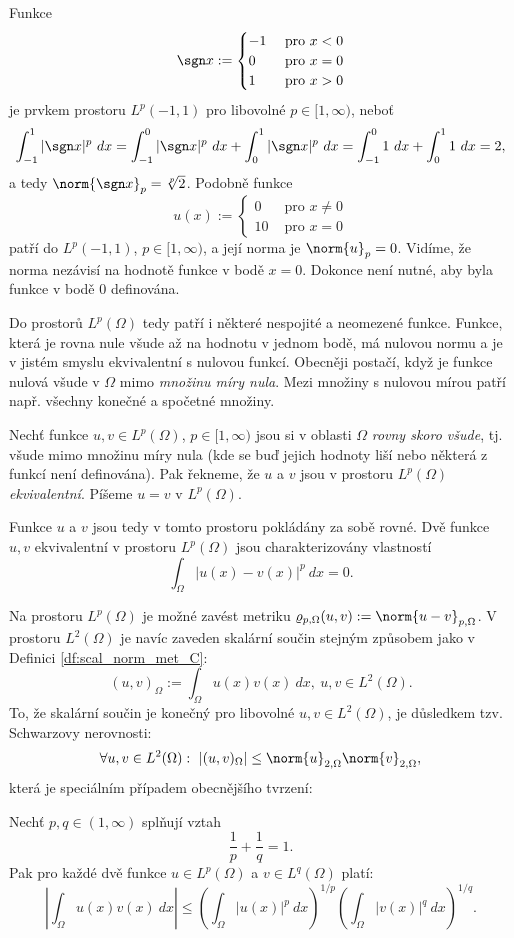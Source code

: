 \begin{ex}
Funkce
\[ \sgn x:=\begin{cases}-1 & \mbox{ pro }x<0\\0 & \mbox{ pro }x=0\\1 & \mbox{ pro }x>0\end{cases} \]
je prvkem prostoru $L^p(-1,1)$ pro libovolné $p\in[1,\infty)$, neboť
\[ \int_{-1}^1 |\sgn x|^p~dx = \int_{-1}^0 |\sgn x|^p ~dx + \int_0^1 |\sgn x|^p~dx = \int_{-1}^0 1~dx + \int_0^1 1~dx = 2, \]
a tedy $\norm{\sgn x}_p = \sqrt[p]{2}$.
Podobně funkce
\[ u(x) := \begin{cases}0 & \mbox{ pro }x\neq 0\\10 & \mbox{ pro }x=0\end{cases} \]
patří do $L^p(-1,1)$, $p\in[1,\infty)$, a její norma je $\norm{u}_p=0$.
Vidíme, že norma nezávisí na hodnotě funkce v bodě $x=0$. Dokonce není nutné, aby byla funkce v bodě 0 definována.
\end{ex}

Do prostorů $L^p(\Omega)$ tedy patří i některé nespojité a neomezené funkce.
Funkce, která je rovna nule všude až na hodnotu v jednom bodě, má nulovou normu a je v jistém smyslu ekvivalentní s nulovou funkcí.
Obecněji postačí, když je funkce nulová všude v $\Omega$ mimo \emph{množinu míry nula}.
Mezi množiny s nulovou mírou patří např. všechny konečné a spočetné množiny.

\begin{df}
Nechť funkce $u,v\in L^p(\Omega)$, $p\in[1,\infty)$ jsou si v oblasti $\Omega$ \emph{rovny skoro všude}, tj. všude mimo množinu míry nula (kde se buď jejich hodnoty liší nebo některá z funkcí není definována).
Pak řekneme, že $u$ a $v$ jsou v prostoru $L^p(\Omega)$ \emph{ekvivalentní}.
Píšeme $u=v$ v $L^p(\Omega)$.
\end{df}
Funkce $u$ a $v$ jsou tedy v tomto prostoru pokládány za sobě rovné.
Dvě funkce $u,v$ ekvivalentní v prostoru $L^p(\Omega)$ jsou charakterizovány vlastností
\[ \int_\Omega|u(x)-v(x)|^p~dx = 0. \]

Na prostoru $L^p(\Omega)$ je možné zavést metriku $\varrho_{p,\Omega}(u,v):=\norm{u-v}_{p,\Omega}$.
V prostoru $L^2(\Omega)$ je navíc zaveden skalární součin stejným způsobem jako v Definici \ref{df:scal_norm_met_C}:
\[ (u,v)_\Omega := \int_\Omega u(x)v(x)~dx,~u,v\in L^2(\Omega). \]
To, že skalární součin je konečný pro libovolné $u,v\in L^2(\Omega)$, je důsledkem tzv. Schwarzovy nerovnosti:
\[ \forall u,v\in L^2(\Omega):~|(u,v)_\Omega| \le \norm{u}_{2,\Omega} \norm{v}_{2,\Omega}, \]
která je speciálním případem obecnějšího tvrzení:
\begin{veta}
Nechť $p,q\in(1,\infty)$ splňují vztah
\[ \frac1p + \frac1q = 1. \]
Pak pro každé dvě funkce $u\in L^p(\Omega)$ a $v\in L^q(\Omega)$ platí:
\[ \left|\int_\Omega u(x)v(x)~dx\right| \le \left(\int_\Omega|u(x)|^p~dx\right)^{1/p} \left(\int_\Omega|v(x)|^q~dx\right)^{1/q}. \]
\end{veta}



